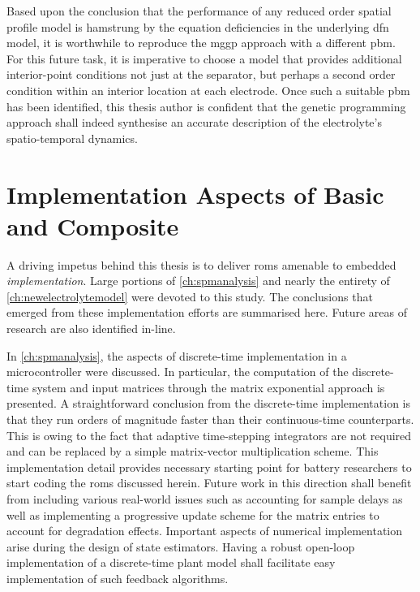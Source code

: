 Based upon the conclusion that the performance of any reduced order spatial
profile model is hamstrung by the equation deficiencies in the underlying
\gls{dfn} model, it is worthwhile to reproduce the \gls{mggp} approach with a
different \gls{pbm}. For this future task, it is imperative to choose a model
that provides additional interior-point conditions \ie{} not just at the
separator, but perhaps a second order condition within an interior location at
each electrode. Once such a suitable \gls{pbm} has been identified, this thesis
author is confident that the genetic programming approach shall indeed
synthesise an accurate description of the electrolyte's spatio-temporal
dynamics.

\section{Implementation Aspects of Basic and Composite }

A driving impetus behind this thesis is to deliver \glspl{rom} amenable  to
embedded \emph{implementation}. Large portions of \cref{ch:spmanalysis} and
nearly the entirety of \cref{ch:newelectrolytemodel} were devoted to this study.
The conclusions that emerged from these implementation efforts are summarised
here. Future areas of research are also identified in-line.

In \cref{ch:spmanalysis}, the aspects of discrete-time implementation in a
microcontroller were discussed. In particular, the computation of the
discrete-time system and input matrices through  the  matrix exponential
approach is presented. A straightforward conclusion from the discrete-time
implementation is that they run orders of magnitude faster than their
continuous-time counterparts. This is owing to the fact that adaptive
time-stepping integrators are not required and can be replaced by a simple
matrix-vector multiplication scheme. This implementation detail provides
necessary starting point for battery researchers to start coding the \glspl{rom}
discussed herein. Future work in this direction shall benefit from including
various real-world issues such as accounting for sample delays as well as
implementing a progressive update scheme for the matrix entries to account for
degradation effects. Important aspects of numerical implementation arise during
the design of state estimators. Having a robust open-loop implementation of a
discrete-time plant model shall facilitate easy implementation of such feedback
algorithms.

